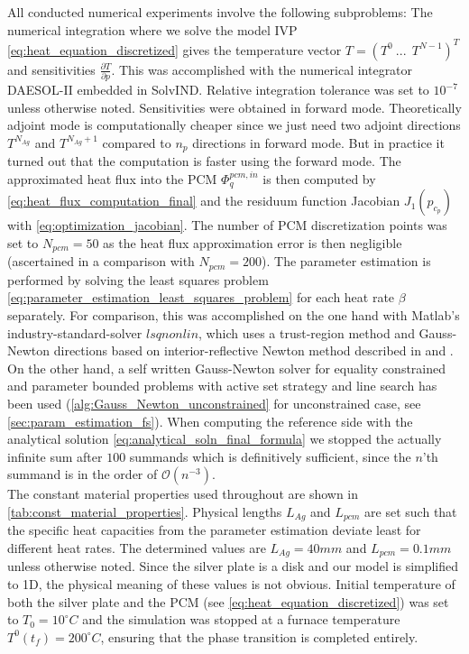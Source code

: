 \documentclass{scrartcl}[12pt, halfparskip]
\numberwithin{equation}{section}
\numberwithin{figure}{section}
\numberwithin{table}{section}
\begin{document}
All conducted numerical experiments involve the following subproblems: The numerical integration where we solve the model IVP \cref{eq:heat_equation_discretized} gives the temperature vector $T = (T^0 \ ... \ \ T^{N-1} )^T$ and sensitivities $\frac{\partial T}{\partial p}$. 
This was accomplished with the numerical integrator DAESOL-II embedded in SolvIND. Relative integration tolerance was set to $10^{-7}$ unless otherwise noted.
Sensitivities were obtained in forward mode. Theoretically adjoint mode is computationally cheaper since we just need two adjoint directions $T^{N_{Ag}}$ and $T^{N_{Ag}+1}$ compared to $n_p$ directions in forward mode. But in practice it turned out that the computation is faster using the forward mode.
The approximated heat flux into the PCM $\varPhi_q^{pcm,in}$ is then computed by \cref{eq:heat_flux_computation_final} and the residuum function Jacobian $J_1(p_{c_p})$ with \cref{eq:optimization_jacobian}. 
The number of PCM discretization points was set to $N_{pcm}=50$ as the heat flux approximation error is then negligible (ascertained in a comparison with $N_{pcm}=200$). 
The parameter estimation is performed by solving the least squares problem \cref{eq:parameter_estimation_least_squares_problem} for each heat rate $\beta$ separately. 
For comparison, this was accomplished on the one hand with Matlab's industry-standard-solver $lsqnonlin$, which uses a trust-region method and Gauss-Newton directions based on interior-reflective Newton method described in \cite{lsqnonlin_alg1} and \cite{lsqnonlin_alg2}. 
On the other hand, a self written Gauss-Newton solver for equality constrained and parameter bounded problems with active set strategy and line search has been used (\cref{alg:Gauss_Newton_unconstrained} for unconstrained case, see \cref{sec:param_estimation_fs}).
When computing the reference side with the analytical solution \cref{eq:analytical_soln_final_formula} we stopped the actually infinite sum after $100$ summands which is definitively sufficient, since the $n$'th summand is in the order of $\mathcal{O}(n^{-3})$. \\

The constant material properties used throughout are shown in \cref{tab:const_material_properties}.
Physical lengths $L_{Ag}$ and $L_{pcm}$ are set such that the specific heat capacities from the parameter estimation deviate least for different heat rates. The determined values are $L_{Ag}=40mm$ and $L_{pcm}=0.1mm$ unless otherwise noted. Since the silver plate is a disk and our model is simplified to 1D, the physical meaning of these values is not obvious.
Initial temperature of both the silver plate and the PCM (see \cref{eq:heat_equation_discretized}) was set to $T_0=10^\circ C$ and the simulation was stopped at a furnace temperature $T^0(t_f)=200^\circ C$, ensuring that the phase transition is completed entirely. \\
\end{document}
